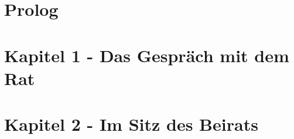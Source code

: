 
\section{Prolog}


\section{Kapitel 1 - Das Gespräch mit dem Rat}



\section{Kapitel 2 - Im Sitz des Beirats}


